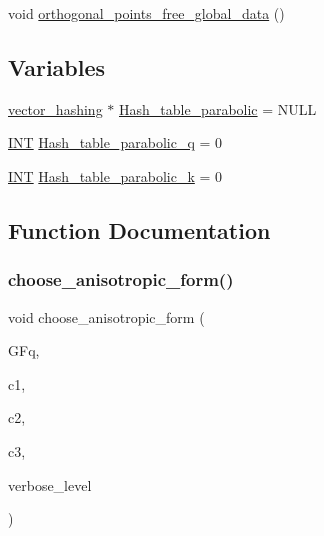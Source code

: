 \begin{DoxyCompactItemize}
\item 
void \mbox{\hyperlink{_l_i_b_2_g_a_l_o_i_s_2orthogonal__points_8_c_a9ff48c751a12182f1cc6ee384f80aa0b}{orthogonal\+\_\+points\+\_\+free\+\_\+global\+\_\+data}} ()
\end{DoxyCompactItemize}
\subsection*{Variables}
\begin{DoxyCompactItemize}
\item 
\mbox{\hyperlink{classvector__hashing}{vector\+\_\+hashing}} $\ast$ \mbox{\hyperlink{_l_i_b_2_g_a_l_o_i_s_2orthogonal__points_8_c_aac1090077865bac928e8ccfc8d84b14f}{Hash\+\_\+table\+\_\+parabolic}} = N\+U\+LL
\item 
\mbox{\hyperlink{galois_8h_a09fddde158a3a20bd2dcadb609de11dc}{I\+NT}} \mbox{\hyperlink{_l_i_b_2_g_a_l_o_i_s_2orthogonal__points_8_c_ac918ba31414a44ec8e3041d47659242f}{Hash\+\_\+table\+\_\+parabolic\+\_\+q}} = 0
\item 
\mbox{\hyperlink{galois_8h_a09fddde158a3a20bd2dcadb609de11dc}{I\+NT}} \mbox{\hyperlink{_l_i_b_2_g_a_l_o_i_s_2orthogonal__points_8_c_a7117ade307c1d1200ac30466132c9caa}{Hash\+\_\+table\+\_\+parabolic\+\_\+k}} = 0
\end{DoxyCompactItemize}


\subsection{Function Documentation}
\mbox{\label{_l_i_b_2_g_a_l_o_i_s_2orthogonal__points_8_c_a0cfd89420fa352dee57b4a6165981456}} 
\subsubsection{\texorpdfstring{choose\+\_\+anisotropic\+\_\+form()}{choose\_anisotropic\_form()}}
{\footnotesize\ttfamily void choose\+\_\+anisotropic\+\_\+form (\begin{DoxyParamCaption}\item[{\mbox{\hyperlink{classfinite__field}{finite\+\_\+field}} \&}]{G\+Fq,  }\item[{\mbox{\hyperlink{galois_8h_a09fddde158a3a20bd2dcadb609de11dc}{I\+NT}} \&}]{c1,  }\item[{\mbox{\hyperlink{galois_8h_a09fddde158a3a20bd2dcadb609de11dc}{I\+NT}} \&}]{c2,  }\item[{\mbox{\hyperlink{galois_8h_a09fddde158a3a20bd2dcadb609de11dc}{I\+NT}} \&}]{c3,  }\item[{\mbox{\hyperlink{galois_8h_a09fddde158a3a20bd2dcadb609de11dc}{I\+NT}}}]{verbose\+\_\+level }\end{DoxyParamCaption})}

